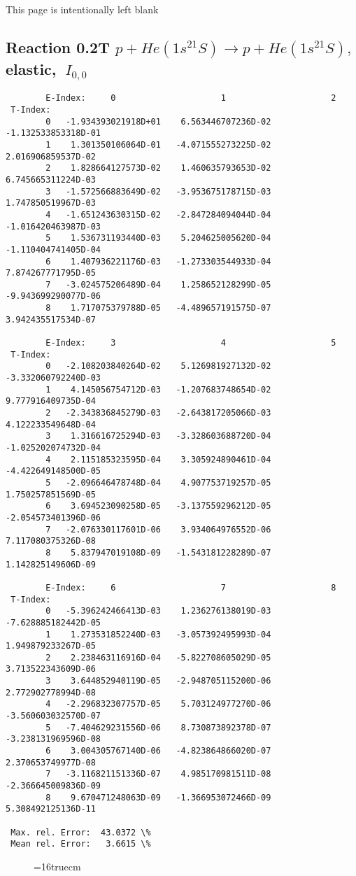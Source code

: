 \documentclass[12pt,dvipdfmx]{article}
\begin{document}
\newpage
This page is intentionally left blank
\newpage

\subsection{
Reaction 0.2T $ p + He(1s^21S) \rightarrow p + He(1s^21S) ,\  $
elastic, $ \  I_{0,0} $
}

\begin{small}\begin{verbatim}
        E-Index:     0                     1                     2
 T-Index:
        0   -1.934393021918D+01    6.563446707236D-02   -1.132533853318D-01
        1    1.301350106064D-01   -4.071555273225D-02    2.016906859537D-02
        2    1.828664127573D-02    1.460635793653D-02    6.745665311224D-03
        3   -1.572566883649D-02   -3.953675178715D-03    1.747850519967D-03
        4   -1.651243630315D-02   -2.847284094044D-04   -1.016420463987D-03
        5    1.536731193440D-03    5.204625005620D-04   -1.110404741405D-04
        6    1.407936221176D-03   -1.273303544933D-04    7.874267771795D-05
        7   -3.024575206489D-04    1.258652128299D-05   -9.943699290077D-06
        8    1.717075379788D-05   -4.489657191575D-07    3.942435517534D-07

        E-Index:     3                     4                     5
 T-Index:
        0   -2.108203840264D-02    5.126981927132D-02   -3.332060792240D-03
        1    4.145056754712D-03   -1.207683748654D-02    9.777916409735D-04
        2   -2.343836845279D-03   -2.643817205066D-03    4.122233549648D-04
        3    1.316616725294D-03   -3.328603688720D-04   -1.025202074732D-04
        4    2.115185323595D-04    3.305924890461D-04   -4.422649148500D-05
        5   -2.096646478748D-04    4.907753719257D-05    1.750257851569D-05
        6    3.694523090258D-05   -3.137559296212D-05   -2.054573401396D-06
        7   -2.076330117601D-06    3.934064976552D-06    7.117080375326D-08
        8    5.837947019108D-09   -1.543181228289D-07    1.142825149606D-09

        E-Index:     6                     7                     8
 T-Index:
        0   -5.396242466413D-03    1.236276138019D-03   -7.628885182442D-05
        1    1.273531852240D-03   -3.057392495993D-04    1.949879233267D-05
        2    2.238463116916D-04   -5.822708605029D-05    3.713522343609D-06
        3    3.644852940119D-05   -2.948705115200D-06    2.772902778994D-08
        4   -2.296832307757D-05    5.703124977270D-06   -3.560603032570D-07
        5   -7.404629231556D-06    8.730873892378D-07   -3.238131969596D-08
        6    3.004305767140D-06   -4.823864866020D-07    2.370653749977D-08
        7   -3.116821151336D-07    4.985170981511D-08   -2.366645009836D-09
        8    9.670471248063D-09   -1.366953072466D-09    5.308492125136D-11

 Max. rel. Error:  43.0372 \%
 Mean rel. Error:   3.6615 \%

\end{verbatim}\end{small}
\begin{figure} \label{0.2T}
\epsfxsize=16truecm
\end{figure}
\newpage
\end{document}
